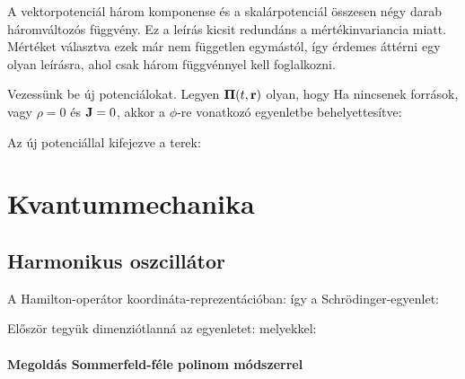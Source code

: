    A vektorpotenciál három komponense és a skalárpotenciál összesen négy darab háromváltozós függvény. Ez a leírás kicsit redundáns a mértékinvariancia miatt. Mértéket választva ezek már nem független egymástól, így érdemes áttérni egy olyan leírásra, ahol csak három függvénnyel kell foglalkozni.
   
   Vezessünk be új potenciálokat. Legyen $\boldsymbol{\Pi}(t,\mathbf{r})$ olyan, hogy 
   Ha nincsenek források, vagy $\rho=0$ és $\mathbf{J}=0$, akkor a $\phi$-re vonatkozó egyenletbe behelyettesítve:
   
   Az új potenciállal kifejezve a terek:
  
 \section{Kvantummechanika}
  
  \subsection{Harmonikus oszcillátor}
   
   A Hamilton-operátor koordináta-reprezentációban:
   így a Schrödinger-egyenlet:
   
   Először tegyük dimenziótlanná az egyenletet:
    melyekkel:
    
   \paragraph{Megoldás Sommerfeld-féle polinom módszerrel}
    
